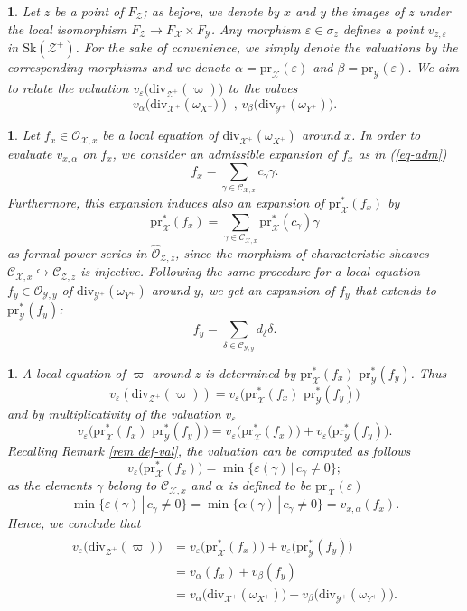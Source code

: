 \documentclass{amsart}%
\numberwithin{equation}{subsection}
\theoremstyle{plain2}
\theoremstyle{definition2}
\theoremstyle{stepstyle}
\theoremstyle{point}
\theoremstyle{subpoint}
\newtheorem{subpoint}[equation]{}%
\newcommand{\spa}[1]{\begin{subpoint}#1\end{subpoint}}           %
\newcommand{\cX}{\ensuremath{\mathscr{X}}}
\newcommand{\caC}{\ensuremath{\mathcal{C}}}
\newcommand{\caO}{\ensuremath{\mathcal{O}}}
\newcommand{\cY}{\ensuremath{\mathscr{Y}}}
\newcommand{\cZ}{\ensuremath{\mathscr{Z}}}
\renewcommand{\cZ}{\ensuremath{\mathscr{Z}}}
\renewcommand{\cY}{\ensuremath{\mathscr{Y}}}
\newcommand{\pr}{\mathrm{pr}}
\newcommand{\divisor}{\mathrm{div}}
\newcommand{\Sk}{\mathrm{Sk}}
\begin{document}
\spa{Let $z$ be a point of $F_{\cZ}$; as before, we denote by $x$ and $y$ the images of $z$ under the local isomorphism $F_{\cZ} \rightarrow F_{\cX} \times F_{\cY}$. Any morphism $\varepsilon \in \sigma_z$ defines a point $v_{z,\varepsilon}$ in $\Sk(\cZ^+)$. For the sake of convenience, we simply denote the valuations by the corresponding morphisms and we denote $\alpha= \pr_{\cX}(\varepsilon)$ and $\beta=\pr_{\cY}(\varepsilon)$. We aim to relate the valuation $v_{\varepsilon}\big(\divisor_{\cZ^+}(\varpi)\big)$ to the values $$v_{\alpha}\big(\divisor_{\cX^+}(\omega_{X^+}\big)) \text{ , } v_{\beta}\big(\divisor_{\cY^+}(\omega_{Y^+})\big).$$}

\spa{Let $f_x \in \caO_{\cX,x}$ be a local equation of $\divisor_{\cX^+}(\omega_{X^+})$ around $x$. In order to evaluate $v_{x,\alpha}$ on $f_x$, we consider an admissible expansion of $f_x$ as in (\ref{eq-adm}) $$f_x=\sum_{\gamma\in \caC_{\cX,x}}c_\gamma \gamma.$$ Furthermore, this expansion induces also an expansion of $\pr_{\cX}^*(f_x)$ by  $$\pr_{\cX}^*(f_x)=\sum_{\gamma\in \caC_{\cX,x} }\pr^*_{\cX}(c_\gamma) \gamma$$ as formal power series in $\widehat{\caO}_{\cZ,z}$, since the morphism of characteristic sheaves $\mathcal{C}_{\cX,x} \hookrightarrow \mathcal{C}_{\cZ,z}$ is injective. Following the same procedure for a local equation $f_y \in \caO_{\cY,y}$ of $\divisor_{\cY^+}(\omega_{Y^+})$ around $y$, we get an expansion of $f_y$ that extends to $\pr_{\cY}^*(f_y)$: 
$$f_y=\sum_{\delta\in \caC_{\cY,y}}d_\delta \delta.$$}

\spa{A local equation of $\varpi$ around $z$ is determined by $\pr_{\cX}^*(f_x)\,\,\pr_{\cY}^*(f_y)$. Thus $$v_{\varepsilon}(\divisor_{\cZ^+}(\varpi))
= v_{\varepsilon}\big(\pr_{\cX}^*(f_x) \,\,\pr_{\cY}^*(f_y)\big)$$ and by multiplicativity of the valuation $v_{\varepsilon}$ $$v_{\varepsilon}\big(\pr_{\cX}^*(f_x) \,\,\pr_{\cY}^*(f_y)\big) = v_{\varepsilon}\big(\pr_{\cX}^*(f_x)\big) + v_{\varepsilon}\big(\pr_{\cY}^*(f_y)\big).$$ Recalling Remark \ref{rem def-val}, the valuation can be computed as follows $$ v_{\varepsilon}\big(\pr_{\cX}^*(f_x)\big) = \min\{\varepsilon(\gamma)\,|\,c_\gamma \neq 0\};$$ as the elements $\gamma$ belong to $\caC_{\cX,x}$ and $\alpha$ is defined to be $\pr_{\cX}(\varepsilon)$ $$\min\{\varepsilon(\gamma)\,|\,c_\gamma \neq 0\} = \min\{\alpha(\gamma)\,|\,c_\gamma \neq 0\} =  v_{x,\alpha}(f_x).$$ Hence, we conclude that \begin{align} \label{equ valuations product}
\begin{split}
v_{\varepsilon}\big(\divisor_{\cZ^+}(\varpi)\big)
& = v_{\varepsilon}\big(\pr_{\cX}^*(f_x)\big) + v_{\varepsilon}\big(\pr_{\cY}^*(f_y)\big)\\
& = v_{\alpha}(f_x) + v_{\beta}(f_y) \\
& = v_{\alpha}\big(\divisor_{\cX^+}(\omega_{X^+})\big) + v_{\beta}\big(\divisor_{\cY^+}(\omega_{Y^+})\big).
\end{split}
\end{align}
}
\end{document}
